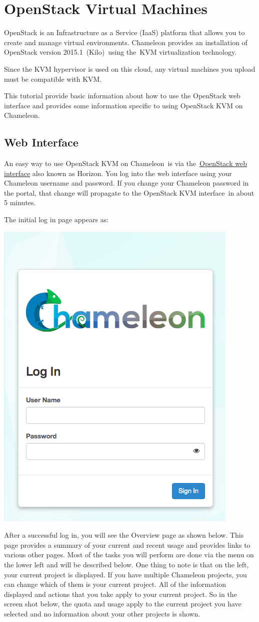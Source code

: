 

\section{OpenStack Virtual Machines}
\label{C:cc-guide}

\FILENAME

OpenStack is an Infrastructure as a Service (IaaS) platform that allows
you to create and manage virtual environments. Chameleon provides an
installation of OpenStack version 2015.1~(Kilo)~using the~KVM
virtualization technology.

Since the KVM hypervisor is used on this cloud, any virtual machines you
upload must be compatible with KVM.

This tutorial provide basic information about how to use the OpenStack
web interface and provides some information specific to using OpenStack
KVM on Chameleon.

\subsection{Web Interface}\label{web-interface-horizon}

An easy way to use OpenStack KVM on Chameleon~is via
the~\href{https://openstack.tacc.chameleoncloud.org/dashboard}{OpenStack
  web interface} also known as Horizon. You log into the web interface
using your Chameleon username and password. If you change your
Chameleon password in the portal, that change will propagate to the
OpenStack KVM interface~in about 5 minutes.

The initial log in page appears as:

\begin{center}
\includegraphics[width=0.3\columnwidth]{images/chameleon/chameleon-login.png}
\end{center}

After a successful log in, you will see the Overview page as shown
below. This page provides a summary of your current and recent usage and
provides links to various other pages. Most of the tasks you will
perform are done via the menu on the lower left and will be described
below. One thing to note is that on the left, your current project is
displayed. If you have multiple Chameleon projects, you can change which
of them is your current project. All of the information displayed and
actions that you take apply to your current project. So in the screen
shot below, the quota and usage apply to the current project you have
selected and no information about your other projects is shown.

